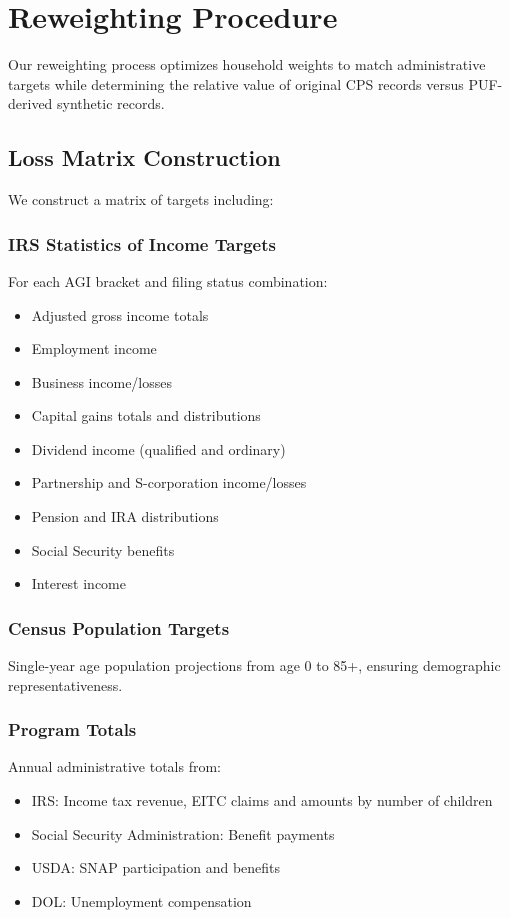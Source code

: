 \section{Reweighting Procedure}\label{sec:reweighting}

Our reweighting process optimizes household weights to match administrative targets while determining the relative value of original CPS records versus PUF-derived synthetic records.

\subsection{Loss Matrix Construction}

We construct a matrix of targets including:

\subsubsection{IRS Statistics of Income Targets}
For each AGI bracket and filing status combination:
\begin{itemize}
    \item Adjusted gross income totals
    \item Employment income
    \item Business income/losses
    \item Capital gains totals and distributions
    \item Dividend income (qualified and ordinary)
    \item Partnership and S-corporation income/losses
    \item Pension and IRA distributions
    \item Social Security benefits
    \item Interest income
\end{itemize}

\subsubsection{Census Population Targets}
Single-year age population projections from age 0 to 85+, ensuring demographic representativeness.

\subsubsection{Program Totals}
Annual administrative totals from:
\begin{itemize}
    \item IRS: Income tax revenue, EITC claims and amounts by number of children
    \item Social Security Administration: Benefit payments
    \item USDA: SNAP participation and benefits
    \item DOL: Unemployment compensation
\end{itemize}

